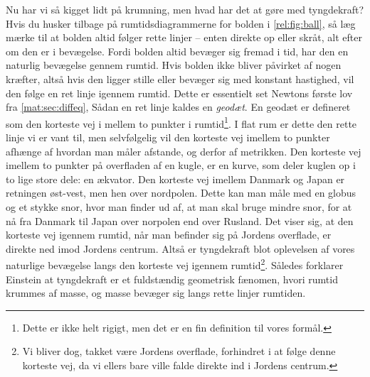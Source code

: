 \documentclass[crop=false, class=memoir]{standalone}
\begin{document}
Nu har vi så kigget lidt på krumning, men hvad har det at gøre med tyngdekraft? Hvis du husker tilbage på rumtidsdiagrammerne for bolden i \cref{rel:fig:ball}, så læg mærke til at bolden altid følger rette linjer -- enten direkte op eller skråt, alt efter om den er i bevægelse. Fordi bolden altid bevæger sig fremad i tid, har den en naturlig bevægelse gennem rumtid. Hvis bolden ikke bliver påvirket af nogen kræfter, altså hvis den ligger stille eller bevæger sig med konstant hastighed, vil den følge en ret linje igennem rumtid. Dette er essentielt set Newtons første lov fra \cref{mat:sec:diffeq}, Sådan en ret linje kaldes en \emph{geodæt}. En geodæt er defineret som den korteste vej i mellem to punkter i rumtid\footnote{Dette er ikke helt rigigt, men det er en fin definition til vores formål.}. I flat rum er dette den rette linje vi er vant til, men selvfølgelig vil den korteste vej imellem to punkter afhænge af hvordan man måler afstande, og derfor af metrikken. Den korteste vej imellem to punkter på overfladen af en kugle, er en kurve, som deler kuglen op i to lige store dele: en ækvator. Den korteste vej imellem Danmark og Japan er retningen øst-vest, men hen over nordpolen. Dette kan man måle med en globus og et stykke snor, hvor man finder ud af, at man skal bruge mindre snor, for at nå fra Danmark til Japan over norpolen end over Rusland. Det viser sig, at den korteste vej igennem rumtid, når man befinder sig på Jordens overflade, er direkte ned imod Jordens centrum. Altså er tyngdekraft blot oplevelsen af vores naturlige bevægelse langs den korteste vej igennem rumtid\footnote{Vi bliver dog, takket være Jordens overflade, forhindret i at følge denne korteste vej, da vi ellers bare ville falde direkte ind i Jordens centrum.}. Således forklarer Einstein at tyngdekraft er et fuldstændig geometrisk fænomen, hvori rumtid krummes af masse, og masse bevæger sig langs rette linjer rumtiden.
\end{document}
